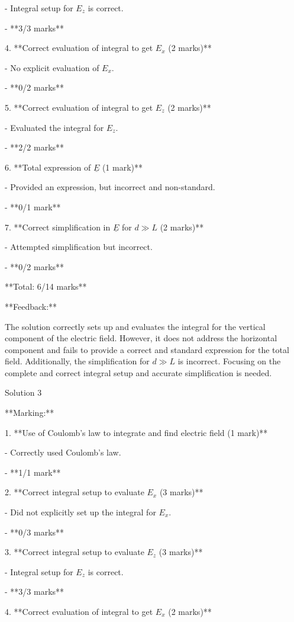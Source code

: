 \documentclass[a4paper,11pt]{article}
\begin{document}
   - Integral setup for \(E_z\) is correct.
   
   - **3/3 marks**

4. **Correct evaluation of integral to get \(E_x\) (2 marks)**

   - No explicit evaluation of \(E_x\).
   
   - **0/2 marks**

5. **Correct evaluation of integral to get \(E_z\) (2 marks)**

   - Evaluated the integral for \(E_z\).
   
   - **2/2 marks**

6. **Total expression of \(\underline{E}\) (1 mark)**

   - Provided an expression, but incorrect and non-standard.
   
   - **0/1 mark**

7. **Correct simplification in \(\underline{E}\) for \(d \gg L\) (2 marks)**

   - Attempted simplification but incorrect.
   
   - **0/2 marks**

**Total: 6/14 marks**

**Feedback:**

The solution correctly sets up and evaluates the integral for the vertical component of the electric field. However, it does not address the horizontal component and fails to provide a correct and standard expression for the total field. Additionally, the simplification for \(d \gg L\) is incorrect. Focusing on the complete and correct integral setup and accurate simplification is needed.

Solution 3

**Marking:**

1. **Use of Coulomb's law to integrate and find electric field (1 mark)**

   - Correctly used Coulomb's law.
   
   - **1/1 mark**

2. **Correct integral setup to evaluate \(E_x\) (3 marks)**

   - Did not explicitly set up the integral for \(E_x\).
   
   - **0/3 marks**

3. **Correct integral setup to evaluate \(E_z\) (3 marks)**

   - Integral setup for \(E_z\) is correct.
   
   - **3/3 marks**

4. **Correct evaluation of integral to get \(E_x\) (2 marks)**
\end{document}
